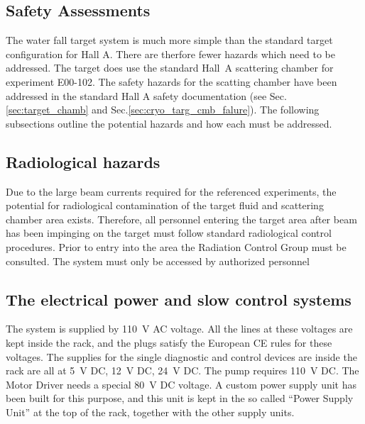 \begin{safetyen}{0}{0}
\section{Safety Assessments}
\end{safetyen}

\begin{safetyen}{50}{50}
The water fall target system is much more simple than the standard
target configuration for Hall A. There are therfore fewer hazards
which need to be addressed. The target does use the standard Hall~A 
scattering chamber for experiment E00-102. The safety hazards for
the scatting chamber have been addressed in the standard Hall A safety
documentation (see Sec.\ref{sec:target_chamb} 
and Sec.\ref{sec:cryo_targ_cmb_falure}). 
The following subsections outline the potential hazards
and how each must be addressed.
\end{safetyen}

\begin{safetyen}{10}{10}
\subsection{Radiological hazards}
\end{safetyen}

Due to the large beam currents required for the referenced experiments,
the potential for radiological contamination of the target fluid and
scattering chamber area exists. Therefore, all personnel entering
the target area after beam has been impinging on the target must follow
standard radiological control procedures. Prior to entry into the
area the Radiation Control Group must be consulted. The system must
only be accessed by authorized personnel


\begin{safetyen}{10}{10}
\subsection{The electrical power and slow control systems}
\end{safetyen}

The system is supplied by 110~V AC voltage. All the lines at these
voltages are kept inside the rack, and the plugs satisfy the European
CE rules for these voltages. The supplies for the single diagnostic
and control devices are inside the rack are all at 5~V DC, 12~V
DC, 24~V DC. The pump requires 110~V DC. The Motor Driver needs
a special 80~V DC voltage. A custom power supply unit has been built
for this purpose, and this unit is kept in the so called 
``Power Supply Unit'' at the top of the rack, together with the other
supply units. 

